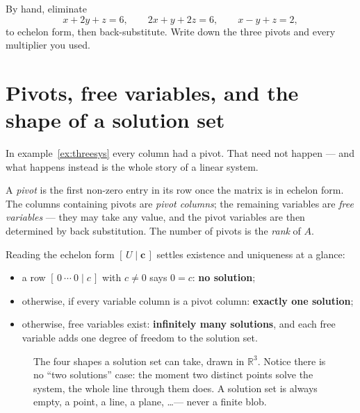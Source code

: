 \begin{exercise}[easy]
By hand, eliminate
\[
  x + 2y + z = 6,\qquad
  2x + y + 2z = 6,\qquad
  x - y + z = 2,
\]
to echelon form, then back-substitute. Write down the three pivots and every multiplier you used.
\end{exercise}

\section{Pivots, free variables, and the shape of a solution set}\label{sec:shape}

In example~\ref{ex:threesys} every column had a pivot. That need not happen — and what happens instead is the whole story of a linear system.

\begin{definition}\label{def:pivot}
A \emph{pivot} is the first non-zero entry in its row once the matrix is in echelon form. The columns containing pivots are \emph{pivot columns}; the remaining variables are \emph{free variables} — they may take any value, and the pivot variables are then determined by back substitution. The number of pivots is the \emph{rank} of $A$.
\end{definition}

Reading the echelon form $[\,U\mid\mathbf{c}\,]$ settles existence and uniqueness at a glance:
\begin{itemize}
  \item a row $[\,0\ \cdots\ 0 \mid c\,]$ with $c\neq0$ says $0=c$: \textbf{no solution};
  \item otherwise, if every variable column is a pivot column: \textbf{exactly one solution};
  \item otherwise, free variables exist: \textbf{infinitely many solutions}, and each free variable adds one degree of freedom to the solution set.
\end{itemize}

\begin{figure}[htbp]
\centering

\caption{The four shapes a solution set can take, drawn in $\mathbb{R}^3$. Notice there is no ``two solutions'' case: the moment two distinct points solve the system, the whole line through them does. A solution set is always empty, a point, a line, a plane, \dots — never a finite blob.}
\label{fig:solgeom}
\end{figure}

